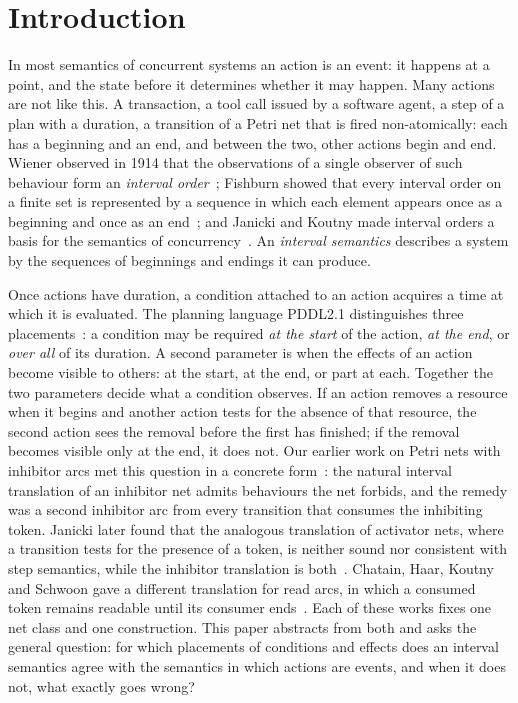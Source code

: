 \documentclass[preprint,12pt]{elsarticle}
\theoremstyle{plain}
\theoremstyle{definition}
\begin{document}
\section{Introduction}
\label{sec:intro}

In most semantics of concurrent systems an action is an event: it happens at a point, and the state before it determines whether it may happen. Many actions are not like this. A transaction, a tool call issued by a software agent, a step of a plan with a duration, a transition of a Petri net that is fired non-atomically: each has a beginning and an end, and between the two, other actions begin and end. Wiener observed in 1914 that the observations of a single observer of such behaviour form an \emph{interval order}~\cite{Wiener1914}; Fishburn showed that every interval order on a finite set is represented by a sequence in which each element appears once as a beginning and once as an end~\cite{Fishburn1970}; and Janicki and Koutny made interval orders a basis for the semantics of concurrency~\cite{JanickiKoutny1993}. An \emph{interval semantics} describes a system by the sequences of beginnings and endings it can produce.

Once actions have duration, a condition attached to an action acquires a time at which it is evaluated. The planning language PDDL2.1 distinguishes three placements~\cite{FoxLong2003}: a condition may be required \emph{at the start} of the action, \emph{at the end}, or \emph{over all} of its duration. A second parameter is when the effects of an action become visible to others: at the start, at the end, or part at each. Together the two parameters decide what a condition observes. If an action removes a resource when it begins and another action tests for the absence of that resource, the second action sees the removal before the first has finished; if the removal becomes visible only at the end, it does not. Our earlier work on Petri nets with inhibitor arcs met this question in a concrete form~\cite{AlqarniJanicki2015,AlqarniJanicki2018,Alqarni2016}: the natural interval translation of an inhibitor net admits behaviours the net forbids, and the remedy was a second inhibitor arc from every transition that consumes the inhibiting token. Janicki later found that the analogous translation of activator nets, where a transition tests for the presence of a token, is neither sound nor consistent with step semantics, while the inhibitor translation is both~\cite{Janicki2019}. Chatain, Haar, Koutny and Schwoon gave a different translation for read arcs, in which a consumed token remains readable until its consumer ends~\cite{ChatainHaarKoutnySchwoon2015}. Each of these works fixes one net class and one construction. This paper abstracts from both and asks the general question: for which placements of conditions and effects does an interval semantics agree with the semantics in which actions are events, and when it does not, what exactly goes wrong?
\end{document}
